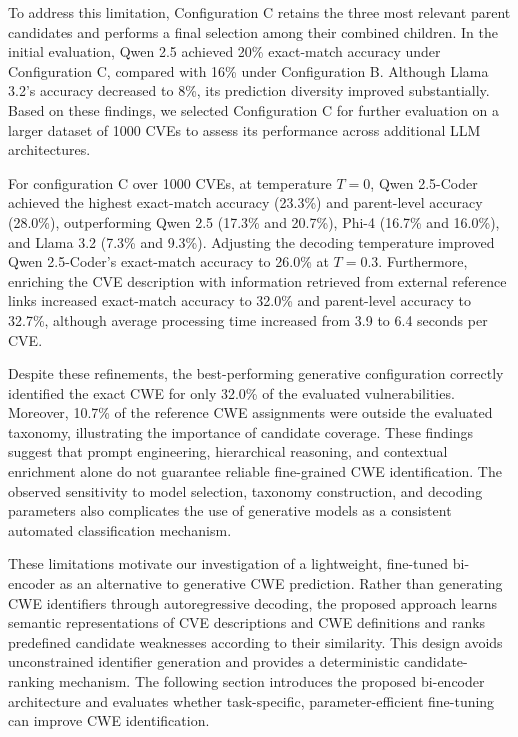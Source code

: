 \documentclass[conference,compsoc]{IEEEtran}
\begin{document}
To address this limitation, Configuration C retains
the three most relevant parent candidates and performs
a final selection among their combined children.
In the initial evaluation, Qwen 2.5 achieved 20\%
exact-match accuracy under Configuration C, compared
with 16\% under Configuration B. Although Llama 3.2's
accuracy decreased to 8\%, its prediction diversity
improved substantially. Based on these findings,
we selected Configuration C for further evaluation
on a larger dataset of 1000 CVEs to assess its
performance across additional LLM architectures.


For configuration C over 1000 CVEs, at temperature $T=0$, Qwen 2.5-Coder
achieved the highest exact-match accuracy (23.3\%)
and parent-level accuracy (28.0\%), outperforming
Qwen 2.5 (17.3\% and 20.7\%), Phi-4 (16.7\%
and 16.0\%), and Llama 3.2 (7.3\% and 9.3\%).
Adjusting the decoding temperature improved
Qwen 2.5-Coder's exact-match accuracy to 26.0\%
at $T=0.3$. Furthermore, enriching the CVE
description with information retrieved from
external reference links increased exact-match
accuracy to 32.0\% and parent-level accuracy
to 32.7\%, although average processing time
increased from 3.9 to 6.4 seconds per CVE.

Despite these refinements, the best-performing
generative configuration correctly identified
the exact CWE for only 32.0\% of the evaluated
vulnerabilities. Moreover, 10.7\% of the
reference CWE assignments were outside the
evaluated taxonomy, illustrating the importance
of candidate coverage. These findings suggest
that prompt engineering, hierarchical reasoning,
and contextual enrichment alone do not guarantee
reliable fine-grained CWE identification.
The observed sensitivity to model selection,
taxonomy construction, and decoding parameters
also complicates the use of generative models
as a consistent automated classification mechanism.

These limitations motivate our investigation of
a lightweight, fine-tuned bi-encoder as an
alternative to generative CWE prediction.
Rather than generating CWE identifiers through
autoregressive decoding, the proposed approach
learns semantic representations of CVE descriptions
and CWE definitions and ranks predefined candidate
weaknesses according to their similarity.
This design avoids unconstrained identifier
generation and provides a deterministic
candidate-ranking mechanism. The following
section introduces the proposed bi-encoder
architecture and evaluates whether task-specific,
parameter-efficient fine-tuning can improve
CWE identification.
\end{document}
